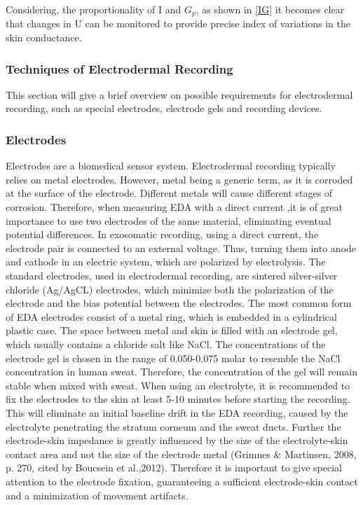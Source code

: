 Considering, the proportionality of I and $G_{p}$, as shown in \ref{IG} it becomes clear that changes in U can be monitored to provide precise index of variations in the skin conductance.\\

\subsubsection{Techniques of Electrodermal Recording}

This section will give a brief overview on possible requirements for electrodermal recording, such as special electrodes, electrode gels and recording devices.

\subsubsection*{Electrodes}
Electrodes are a biomedical sensor system. Electrodermal recording typically relies on metal electrodes. However, metal being a generic term, as it is corroded at the surface of the electrode. Different metals will cause different stages of corrosion. Therefore, when measuring EDA with a direct current ,it is of great importance to use two electrodes of the same material, eliminating eventual potential differences. In exosomatic recording, using a direct current, the electrode pair is connected to an external voltage. Thus, turning them into anode and cathode in an electric system, which are polarized by electrolysis.
The standard electrodes, used in electrodermal recording, are sintered silver-silver chloride (Ag/AgCL) electrodes, which minimize both the polarization of the electrode and the bias potential between the electrodes.
The most common form of EDA electrodes consist of a metal ring, which is embedded in a cylindrical plastic case. The space between metal and skin is filled with an electrode gel, which usually contains a chloride salt like NaCl. The concentrations of the electrode gel is chosen in the range of 0.050-0.075 molar to resemble the NaCl concentration in human sweat. Therefore, the concentration of the gel will remain stable when mixed with sweat. When using an electrolyte, it is recommended to fix the electrodes to the skin at least 5-10 minutes before starting the recording. This will eliminate an initial  baseline drift in the EDA recording, caused by the electrolyte penetrating the stratum corneum and the sweat ducts. Further the electrode-skin impedance is greatly influenced by the size of the electrolyte-skin contact area and not the size of the electrode metal (Grimnes & Martinsen, 2008, p.
270, cited by Boucsein et al.,2012). Therefore it is important to give special attention to the electrode fixation, guaranteeing a sufficient electrode-skin contact and a minimization of movement artifacts.

